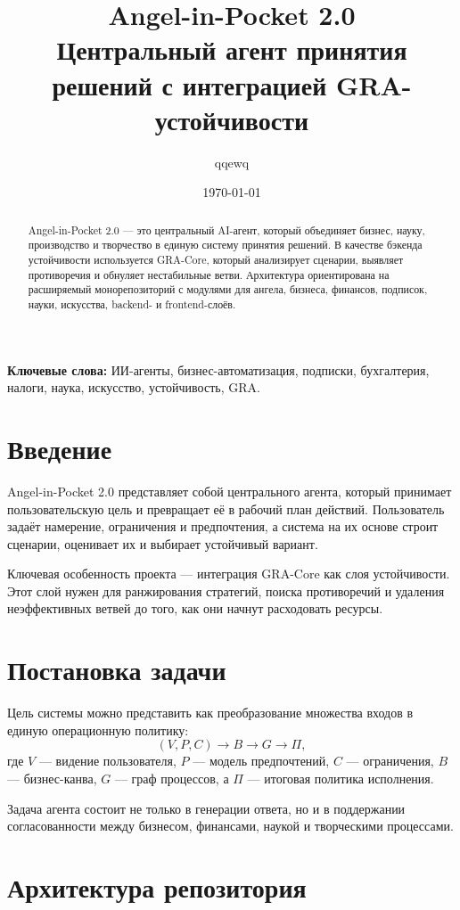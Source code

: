 \documentclass[11pt,a4paper]{article}
\title{Angel-in-Pocket 2.0\\
Центральный агент принятия решений с интеграцией GRA-устойчивости}
\author{qqewq}
\date{\today}
\begin{document}
\maketitle

\begin{abstract}
Angel-in-Pocket 2.0 — это центральный AI-агент, который объединяет бизнес, науку, производство и творчество в единую систему принятия решений. В качестве бэкенда устойчивости используется GRA-Core, который анализирует сценарии, выявляет противоречия и обнуляет нестабильные ветви. Архитектура ориентирована на расширяемый монорепозиторий с модулями для ангела, бизнеса, финансов, подписок, науки, искусства, backend- и frontend-слоёв.
\end{abstract}

\noindent\textbf{Ключевые слова:} ИИ-агенты, бизнес-автоматизация, подписки, бухгалтерия, налоги, наука, искусство, устойчивость, GRA.

\section{Введение}

Angel-in-Pocket 2.0 представляет собой центрального агента, который принимает пользовательскую цель и превращает её в рабочий план действий. Пользователь задаёт намерение, ограничения и предпочтения, а система на их основе строит сценарии, оценивает их и выбирает устойчивый вариант.

Ключевая особенность проекта — интеграция GRA-Core как слоя устойчивости. Этот слой нужен для ранжирования стратегий, поиска противоречий и удаления неэффективных ветвей до того, как они начнут расходовать ресурсы.

\section{Постановка задачи}

Цель системы можно представить как преобразование множества входов в единую операционную политику:
\[
(V, P, C) \rightarrow B \rightarrow G \rightarrow \Pi,
\]
где $V$ — видение пользователя, $P$ — модель предпочтений, $C$ — ограничения, $B$ — бизнес-канва, $G$ — граф процессов, а $\Pi$ — итоговая политика исполнения.

Задача агента состоит не только в генерации ответа, но и в поддержании согласованности между бизнесом, финансами, наукой и творческими процессами.

\section{Архитектура репозитория}
\end{document}
